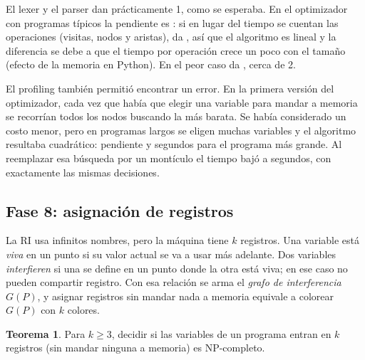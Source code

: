 \documentclass[11pt,a4paper]{article}
\theoremstyle{definition}
\newtheorem{teorema}{Teorema}
\begin{document}
El lexer y el parser dan prácticamente 1, como se esperaba. En el
optimizador con programas típicos la pendiente es \PendOptTipico: si en
lugar del tiempo se cuentan las operaciones (visitas, nodos y aristas), da
\PendOptTrabajo, así que el algoritmo es lineal y la diferencia se debe a
que el tiempo por operación crece un poco con el tamaño (efecto de la
memoria en Python). En el peor caso da \PendOptPeor, cerca de 2.

El profiling también permitió encontrar un error. En la primera versión del
optimizador, cada vez que había que elegir una variable para mandar a
memoria se recorrían todos los nodos buscando la más barata. Se había
considerado un costo menor, pero en programas largos se eligen muchas
variables y el algoritmo resultaba cuadrático: pendiente \OptVUnoPend{} y
\OptVUnoMax{} segundos para el programa más grande. Al reemplazar esa
búsqueda por un montículo el tiempo bajó a \OptVDosMax{} segundos, con
exactamente las mismas decisiones.

\subsection{Fase 8: asignación de registros}
\label{sec:registros}

La RI usa infinitos nombres, pero la máquina tiene $k$ registros. Una
variable está \emph{viva} en un punto si su valor actual se va a usar más
adelante. Dos variables \emph{interfieren} si una se define en un punto
donde la otra está viva; en ese caso no pueden compartir registro. Con esa
relación se arma el \emph{grafo de interferencia} $G(P)$, y asignar
registros sin mandar nada a memoria equivale a colorear $G(P)$ con $k$
colores.

\begin{teorema}
Para $k \ge 3$, decidir si las variables de un programa entran en $k$
registros (sin mandar ninguna a memoria) es NP-completo.
\end{teorema}
\end{document}
